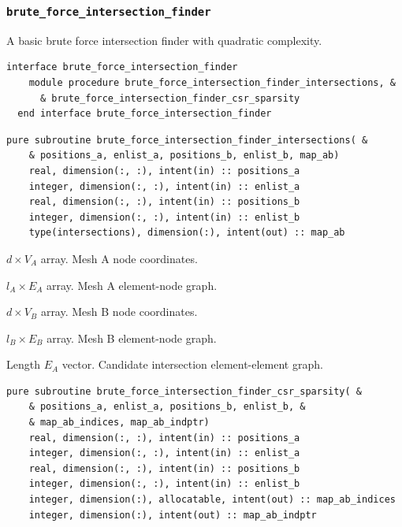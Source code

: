 \documentclass{article}
\begin{document}
\subsubsection{\texttt{brute\_force\_intersection\_finder}}

A basic brute force intersection finder with quadratic complexity.

\begin{lstlisting}[language=FORTRAN]
  interface brute_force_intersection_finder
    module procedure brute_force_intersection_finder_intersections, &
      & brute_force_intersection_finder_csr_sparsity
  end interface brute_force_intersection_finder
\end{lstlisting}

\begin{lstlisting}[language=FORTRAN]
  pure subroutine brute_force_intersection_finder_intersections( &
    & positions_a, enlist_a, positions_b, enlist_b, map_ab)
    real, dimension(:, :), intent(in) :: positions_a
    integer, dimension(:, :), intent(in) :: enlist_a
    real, dimension(:, :), intent(in) :: positions_b
    integer, dimension(:, :), intent(in) :: enlist_b
    type(intersections), dimension(:), intent(out) :: map_ab
\end{lstlisting}

\begin{description}[font=\ttfamily\bfseries,leftmargin=2.2\parindent,labelindent=1.7\parindent,noitemsep]
  \item[positions\_a] $d \times V_A$ array. Mesh A node coordinates.
  \item[enlist\_a] $l_A \times E_A$ array. Mesh A element-node graph.
  \item[positions\_b] $d \times V_B$ array. Mesh B node coordinates.
  \item[enlist\_b] $l_B \times E_B$ array. Mesh B element-node graph.
  \item[map\_ab] Length $E_A$ vector. Candidate intersection element-element
    graph.
\end{description}

\begin{lstlisting}[language=FORTRAN]
  pure subroutine brute_force_intersection_finder_csr_sparsity( &
    & positions_a, enlist_a, positions_b, enlist_b, &
    & map_ab_indices, map_ab_indptr)
    real, dimension(:, :), intent(in) :: positions_a
    integer, dimension(:, :), intent(in) :: enlist_a
    real, dimension(:, :), intent(in) :: positions_b
    integer, dimension(:, :), intent(in) :: enlist_b
    integer, dimension(:), allocatable, intent(out) :: map_ab_indices
    integer, dimension(:), intent(out) :: map_ab_indptr
\end{lstlisting}
\end{document}
